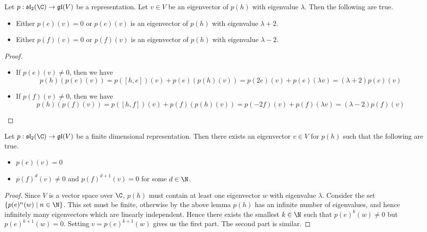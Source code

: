 \documentclass[a4paper]{article}
\begin{document}
\begin{lmm}{}{} Let $p:\mathfrak{sl}_2(\C)\to\mathfrak{gl}(V)$ be a representation. Let $v\in V$ be an eigenvector of $p(h)$ with eigenvalue $\lambda$. Then the following are true. 
\begin{itemize}
\item Either $p(e)(v)=0$ or $p(e)(v)$ is an eigenvector of $p(h)$ with eigenvalue $\lambda+2$. 
\item Either $p(f)(v)=0$ or $p(f)(v)$ is an eigenvector of $p(h)$ with eigenvalue $\lambda-2$. 
\end{itemize} \tcbline
\begin{proof}~
\begin{itemize}
\item If $p(e)(v)\neq 0$, then we have $$p(h)(p(e)(v))=p([h,e])(v)+p(e)(p(h)(v))=p(2e)(v)+p(e)(\lambda v)=(\lambda+2)p(e)(v)$$
\item If $p(f)(v)\neq 0$, then we have $$p(h)(p(f)(v))=p([h,f])(v)+p(f)(p(h)(v))=p(-2f)(v)+p(f)(\lambda v)=(\lambda-2)p(f)(v)$$
\end{itemize}
\end{proof}
\end{lmm}

\begin{lmm}{}{} Let $p:\mathfrak{sl}_2(\C)\to\mathfrak{gl}(V)$ be a finite dimensional representation. Then there exists an eigenvector $v\in V$ for $p(h)$ such that the following are true. 
\begin{itemize}
\item $p(e)(v)=0$
\item $p(f)^d(v)\neq 0$ and $p(f)^{d+1}(v)=0$ for some $d\in\N$. 
\end{itemize} \tcbline
\begin{proof}
Since $V$ is a vector space over $\C$, $p(h)$ must contain at least one eigenvector $w$ with eigenvalue $\lambda$. Consider the set $\{p(e)^n(w)\;|\;n\in\N\}$. This set must be finite, otherwise by the above lemma $p(h)$ has an infinite number of eigenvalues, and hence infinitely many eigenvectors which are linearly independent. Hence there exists the smallest $k\in\N$ such that $p(e)^k(w)\neq 0$ but $p(e)^{k+1}(w)=0$. Setting $v=p(e)^{k+1}(w)$ gives us the first part. The second part is similar. 
\end{proof}
\end{lmm}
\end{document}
